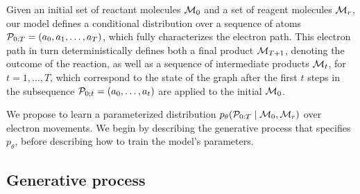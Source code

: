 Given an initial set of reactant molecules ${\mathcal{M}}_0$ and a set of reagent molecules ${\mathcal{M}}_r$, 
our model defines a conditional distribution over a sequence of atoms ${\mathcal{P}}_{0:T} = (a_0, a_1, \ldots, a_T)$,
which fully characterizes the electron path.
This electron path in turn deterministically defines both a final product ${\mathcal{M}}_{T+1}$, 
denoting the outcome of the reaction,
as well as a sequence of intermediate products ${\mathcal{M}}_t$, for $t = 1,\dots,T$,
which correspond to the state of the graph after the first $t$ steps in the subsequence ${\mathcal{P}}_{0:t} = (a_0, \dots, a_t)$ are applied to the initial ${\mathcal{M}}_0$.


We propose to learn a parameterized distribution $p_\theta( {\mathcal{P}}_{0:T} \mid {\mathcal{M}}_0, {\mathcal{M}}_r)$ over electron movements. 
We begin by describing the generative process %
that specifies $p_\theta$, before describing how to train the model's parameters.


\subsection{Generative process}

%



